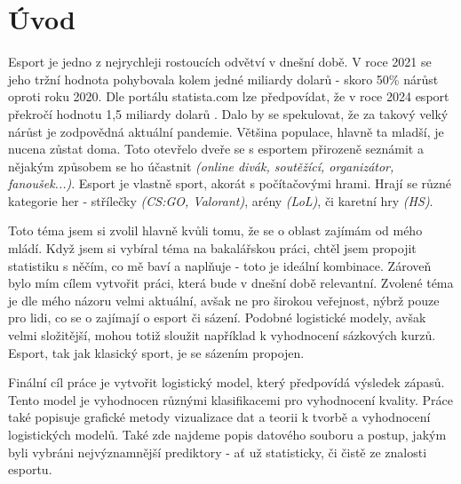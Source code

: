 \chapter{Úvod}
Esport je jedno z nejrychleji rostoucích odvětví v dnešní době. V roce 2021 se jeho tržní hodnota pohybovala kolem jedné miliardy dolarů - skoro
50\% nárůst oproti roku 2020. Dle portálu statista.com lze předpovídat, že v roce 2024 esport překročí hodnotu 1,5 miliardy dolarů \cite{Gough2021}.
Dalo by se spekulovat, že za takový velký nárůst je zodpovědná aktuální pandemie. Většina populace, hlavně ta mladší, je nucena zůstat doma. Toto otevřelo dveře
se s esportem přirozeně seznámit a nějakým způsobem se ho účastnit \textit{(online divák, soutěžící, organizátor, fanoušek...)}. Esport je vlastně sport,
akorát s počítačovými hrami. Hrají se různé kategorie her - střílečky \textit{(\ac{CS:GO}, Valorant)}, arény \textit{(\ac{LoL})}, či karetní hry
\textit{(\ac{HS})}.

Toto téma jsem si zvolil hlavně kvůli tomu, že se o oblast zajímám od mého mládí. Když jsem si vybíral téma na bakalářskou práci,
chtěl jsem propojit statistiku s něčím, co mě baví a naplňuje - toto je ideální kombinace. Zároveň bylo mím cílem vytvořit práci, která bude v dnešní době relevantní.
Zvolené téma je dle mého názoru velmi aktuální, avšak ne pro širokou veřejnost, nýbrž pouze pro lidi, co se o zajímají o esport či sázení.
Podobné logistické modely, avšak velmi složitější, mohou totiž sloužit například k vyhodnocení sázkových kurzů. Esport, tak jak klasický sport, je se sázením propojen. 

Finální cíl práce je vytvořit logistický model, který předpovídá výsledek zápasů. Tento model je vyhodnocen různými klasifikacemi pro vyhodnocení kvality.
Práce také popisuje grafické metody vizualizace dat a teorii k tvorbě a vyhodnocení logistických modelů. Také zde najdeme popis datového souboru a postup,
jakým byli vybráni nejvýznamnější prediktory - ať už statisticky, či čistě ze znalosti esportu. 
